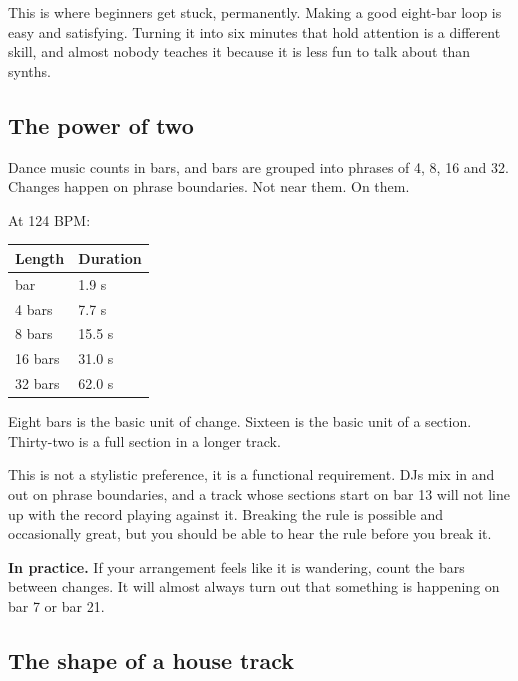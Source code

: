 This is where beginners get stuck, permanently. Making a good eight-bar loop is easy and
satisfying. Turning it into six minutes that hold attention is a different skill, and almost
nobody teaches it because it is less fun to talk about than synths.

\subsection{The power of two}\label{th06_arrangement-the-power-of-two}

Dance music counts in bars, and bars are grouped into phrases of 4, 8, 16 and 32. Changes
happen on phrase boundaries. Not near them. On them.

At 124 BPM:

{\def\LTcaptype{none} %
\begin{longtable}[]{@{}ll@{}}
\toprule\noalign{}
Length & Duration \\
\midrule\noalign{}
\endhead
\bottomrule\noalign{}
\endlastfoot
1 bar & 1.9 s \\
4 bars & 7.7 s \\
8 bars & 15.5 s \\
16 bars & 31.0 s \\
32 bars & 62.0 s \\
\end{longtable}
}

Eight bars is the basic unit of change. Sixteen is the basic unit of a section. Thirty-two
is a full section in a longer track.

This is not a stylistic preference, it is a functional requirement. DJs mix in and out on
phrase boundaries, and a track whose sections start on bar 13 will not line up with the
record playing against it. Breaking the rule is possible and occasionally great, but you
should be able to hear the rule before you break it.

\begin{intuitionbox}
\textbf{In practice.} If your arrangement feels like it is wandering, count the bars between
changes. It will almost always turn out that something is happening on bar 7 or bar 21.
\end{intuitionbox}

\subsection{The shape of a house track}\label{th06_arrangement-the-shape-of-a-house-track}

